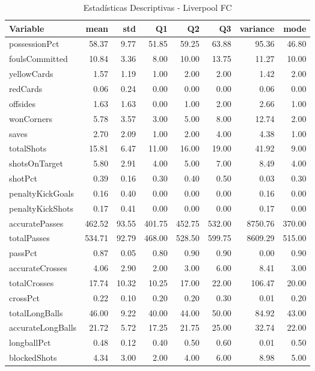 \begin{table}[H]
\centering
\caption{Estadísticas Descriptivas - Liverpool FC}
\label{tab:eng_liverpool}
\small
\begin{tabular}{lrrrrrrr}
\hline
Variable & mean & std & Q1 & Q2 & Q3 & variance & mode \\
\hline
possessionPct & 58.37 & 9.77 & 51.85 & 59.25 & 63.88 & 95.36 & 46.80 \\
foulsCommitted & 10.84 & 3.36 & 8.00 & 10.00 & 13.75 & 11.27 & 10.00 \\
yellowCards & 1.57 & 1.19 & 1.00 & 2.00 & 2.00 & 1.42 & 2.00 \\
redCards & 0.06 & 0.24 & 0.00 & 0.00 & 0.00 & 0.06 & 0.00 \\
offsides & 1.63 & 1.63 & 0.00 & 1.00 & 2.00 & 2.66 & 1.00 \\
wonCorners & 5.78 & 3.57 & 3.00 & 5.00 & 8.00 & 12.74 & 2.00 \\
saves & 2.70 & 2.09 & 1.00 & 2.00 & 4.00 & 4.38 & 1.00 \\
totalShots & 15.81 & 6.47 & 11.00 & 16.00 & 19.00 & 41.92 & 9.00 \\
shotsOnTarget & 5.80 & 2.91 & 4.00 & 5.00 & 7.00 & 8.49 & 4.00 \\
shotPct & 0.39 & 0.16 & 0.30 & 0.40 & 0.50 & 0.03 & 0.30 \\
penaltyKickGoals & 0.16 & 0.40 & 0.00 & 0.00 & 0.00 & 0.16 & 0.00 \\
penaltyKickShots & 0.17 & 0.41 & 0.00 & 0.00 & 0.00 & 0.17 & 0.00 \\
accuratePasses & 462.52 & 93.55 & 401.75 & 452.75 & 532.00 & 8750.76 & 370.00 \\
totalPasses & 534.71 & 92.79 & 468.00 & 528.50 & 599.75 & 8609.29 & 515.00 \\
passPct & 0.87 & 0.05 & 0.80 & 0.90 & 0.90 & 0.00 & 0.90 \\
accurateCrosses & 4.06 & 2.90 & 2.00 & 3.00 & 6.00 & 8.41 & 3.00 \\
totalCrosses & 17.74 & 10.32 & 10.25 & 17.00 & 22.00 & 106.47 & 20.00 \\
crossPct & 0.22 & 0.10 & 0.20 & 0.20 & 0.30 & 0.01 & 0.20 \\
totalLongBalls & 46.00 & 9.22 & 40.00 & 44.00 & 50.00 & 84.92 & 43.00 \\
accurateLongBalls & 21.72 & 5.72 & 17.25 & 21.75 & 25.00 & 32.74 & 22.00 \\
longballPct & 0.48 & 0.12 & 0.40 & 0.50 & 0.60 & 0.01 & 0.50 \\
blockedShots & 4.34 & 3.00 & 2.00 & 4.00 & 6.00 & 8.98 & 5.00 \\

\end{tabular}
\end{table}
